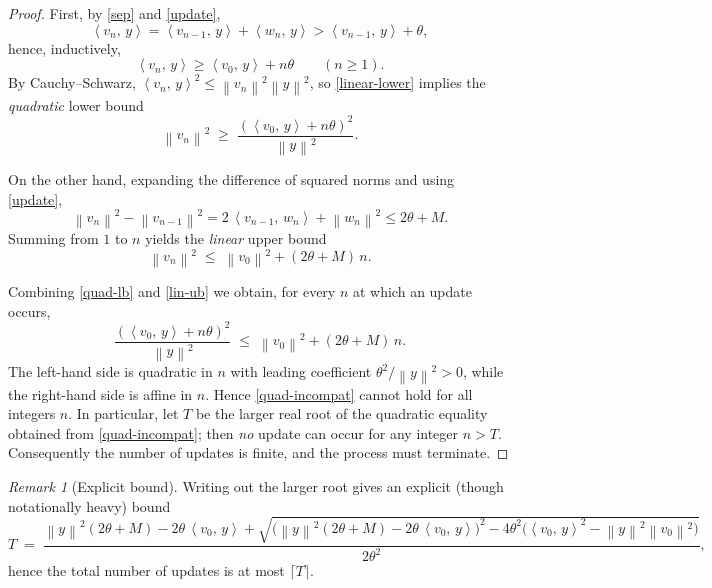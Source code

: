 \documentclass[11pt]{article}
\theoremstyle{remark}
\newtheorem{remark}{Remark}
\newcommand{\inner}[2]{\left\langle #1,\, #2 \right\rangle}
\newcommand{\norm}[1]{\left\lVert #1 \right\rVert}
\begin{document}
\begin{proof}
First, by \eqref{sep} and \eqref{update},
\begin{equation}\label{y-growth}
  \inner{v_n}{y}=\inner{v_{n-1}}{y}+\inner{w_n}{y}
  > \inner{v_{n-1}}{y}+\theta,
\end{equation}
hence, inductively,
\begin{equation}\label{linear-lower}
  \inner{v_n}{y} \ge \inner{v_0}{y} + n\theta \qquad (n\ge1).
\end{equation}
By Cauchy--Schwarz,
\(
  \inner{v_n}{y}^2 \le \norm{v_n}^2\norm{y}^2
\),
so \eqref{linear-lower} implies the \emph{quadratic} lower bound
\begin{equation}\label{quad-lb}
  \norm{v_n}^2 \;\ge\; \dfrac{(\inner{v_0}{y}+n\theta)^2}{\norm{y}^2}.
\end{equation}

On the other hand, expanding the difference of squared norms and using \eqref{update},
\[
  \norm{v_n}^2-\norm{v_{n-1}}^2
  = 2\,\inner{v_{n-1}}{w_n} + \norm{w_n}^2
  \le 2\theta + M.
\]
Summing from \(1\) to \(n\) yields the \emph{linear} upper bound
\begin{equation}\label{lin-ub}
  \norm{v_n}^2 \;\le\; \norm{v_0}^2 + (2\theta+M)\,n.
\end{equation}

Combining \eqref{quad-lb} and \eqref{lin-ub} we obtain, for every \(n\) at which an update occurs,
\begin{equation}\label{quad-incompat}
  \dfrac{(\inner{v_0}{y}+n\theta)^2}{\norm{y}^2}\;\le\; \norm{v_0}^2 + (2\theta+M)\,n.
\end{equation}
The left-hand side is quadratic in \(n\) with leading coefficient \(\theta^2/\norm{y}^2>0\),
while the right-hand side is affine in \(n\). Hence \eqref{quad-incompat} cannot hold for all
integers \(n\). In particular, let \(T\) be the larger real root of the quadratic equality obtained from
\eqref{quad-incompat}; then \emph{no} update can occur for any integer \(n>T\).
Consequently the number of updates is finite, and the process must terminate.
\end{proof}

\begin{remark}[Explicit bound]
Writing out the larger root gives an explicit (though notationally heavy) bound
\[
  T \;=\; \frac{ \norm{y}^2(2\theta+M) - 2\theta\,\inner{v_0}{y}
         + \sqrt{\big(\norm{y}^2(2\theta+M)-2\theta\,\inner{v_0}{y}\big)^2
         - 4\theta^2\big(\inner{v_0}{y}^2-\norm{y}^2\norm{v_0}^2\big)} }{2\theta^2},
\]
hence the total number of updates is at most \(\lceil T\rceil\).
\end{remark}
\end{document}
